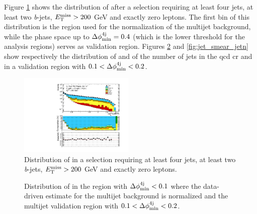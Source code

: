 Figure \ref{fig:jet_smear_dphi} shows the distribution of \dphimin after a selection requiring at least four jets, at least two \textit{b}-jets, $E_{\rm T}^{\mathrm{miss}}>200$ GeV and exactly zero leptons. The first bin of this distribution is the region used for the normalization of the multijet background, 
while the phase space up to $\Delta\phi_{\rm{min}}^{4{\rm{j}}}=0.4$ (which is the lower threshold for the analysis regions) serves as validation region. 
Figures \ref{fig:jet_smear_met} and \ref{fig:jet_smear_jetn} show respectively the distribution of \met and of the number of jets in the \gls{qcd} \gls{cr} and in a validation region with $0.1 < \Delta\phi_{\rm{min}}^{4{\rm{j}}} < 0.2$.

\begin{figure}[h!]
\centering 
\includegraphics[width=0.49\textwidth]{figures/Chap7/Rizzi-Fig7-18.pdf}
\caption{Distribution of \dphimin in a selection requiring at least four jets, at least two \textit{b}-jets, $E_{\rm T}^{\mathrm{miss}}>200$ GeV and exactly zero leptons.}\label{fig:jet_smear_dphi}
\end{figure}


\begin{figure}[h!]
\centering 
{}
\caption{Distribution of \met in  the region with $\Delta\phi_{\rm{min}}^{4{\rm{j}}} < 0.1$ where the data-driven estimate for the multijet background is normalized and  the multijet validation region with $0.1 < \Delta\phi_{\rm{min}}^{4{\rm{j}}} < 0.2$.}\label{fig:jet_smear_met}
\end{figure}

